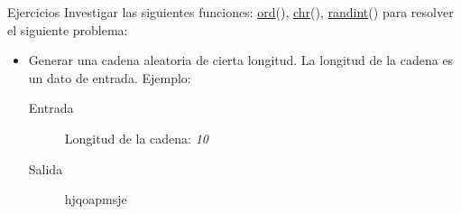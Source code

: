 \documentclass[aspectratio=169]{beamer}
\begin{document}
\begin{frame}[c]{Ejercicios}
  Investigar las siguientes funciones:
  \href{https://www.w3schools.com/python/ref_func_ord.asp}{ord}(),
  \href{https://www.w3schools.com/python/ref_func_chr.asp}{chr}(),
  \href{https://www.w3schools.com/python/ref_random_randint.asp}{randint}()
  para resolver el siguiente problema:

  \vspace{\baselineskip}
  \begin{itemize}
    \item Generar una cadena aleatoria de cierta longitud. La longitud de la
      cadena es un dato de entrada.
      \vspace{\baselineskip}
      Ejemplo:
      \vspace{\baselineskip}
      \begin{description}
        \item[Entrada] Longitud de la cadena: \emph{10}
        \vspace{\baselineskip}
        \item[Salida] hjqoapmsje
      \end{description}
  \end{itemize}
\end{frame}

{ %
  \begin{frame}
  \end{frame}
}
\end{document}
